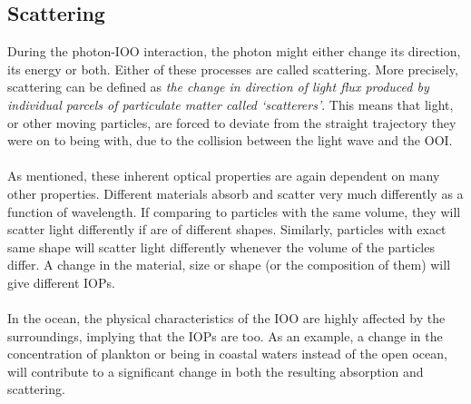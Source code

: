 \subsection{Scattering}
During the photon-IOO interaction, the photon might either change its direction, its energy or both. Either of these processes are called scattering. %
More precisely, scattering can be defined as \textit{the change in direction of light flux produced by individual parcels of particulate matter called ‘scatterers’}. This means that light, or other moving particles, are forced to deviate from the straight trajectory they were on to being with, due to the collision between the light wave and the OOI. 
\\\\
As mentioned, these inherent optical properties are again dependent on many other properties. Different materials absorb and scatter very much differently as a function of wavelength. If comparing to particles with the same volume, they will scatter light differently if are of different shapes. Similarly, particles with exact same shape will scatter light differently whenever the volume of the particles differ. A change in the material, size or shape (or the composition of them) will give different IOPs. 
\\\\
In the ocean, the physical characteristics of the IOO are highly affected by the surroundings, implying that the IOPs are too. As an example, a change in the concentration of plankton or being in coastal waters instead of the open ocean, will contribute to a significant change in both the resulting absorption and scattering. 


